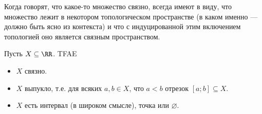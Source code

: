 \documentclass[12pt,a4paper]{article}
\begin{document}
    \begin{remark*}
        Когда говорят, что какое-то множество связно, всегда имеют в виду, что множество лежит в некотором топологическом пространстве (в каком именно --- должно быть ясно из контекста) и что с индуцированной этим включением топологией оно является связным пространством.
    \end{remark*}

    \begin{theorem}
        Пусть $X \subseteq \RR$. TFAE
        \begin{itemize}
            \item $X$ связно.
            \item $X$ выпукло, т.е. для всяких $a, b \in X$, что $a < b$ отрезок $[a; b] \subseteq X$.
            \item $X$ есть интервал (в широком смысле), точка или $\varnothing$.
        \end{itemize}
    \end{theorem}
\end{document}
